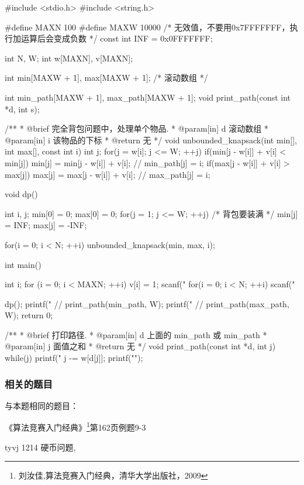 \begin{Codex}[label=coin_change3.c]
#include <stdio.h>
#include <string.h>

#define MAXN 100
#define MAXW 10000
 /* 无效值，不要用0x7FFFFFFF，执行加运算后会变成负数 */
const int INF = 0x0FFFFFFF;

int N, W;
int w[MAXN], v[MAXN];

int min[MAXW + 1], max[MAXW + 1]; /* 滚动数组 */

int min_path[MAXW + 1], max_path[MAXW + 1];
void print_path(const int *d, int s);

/**
 * @brief 完全背包问题中，处理单个物品.
 * @param[in] d 滚动数组
 * @param[in] i 该物品的下标
 * @return 无
 */
void unbounded_knapsack(int min[], int max[], const int i) {
    int j;
    for(j = w[i]; j <= W; ++j) {
        if(min[j - w[i]] + v[i] < min[j]) {
            min[j] = min[j - w[i]] + v[i];
            // min_path[j] = i;
        }
        if(max[j - w[i]] + v[i] > max[j]) {
            max[j] = max[j - w[i]] + v[i];
            // max_path[j] = i;
        }
    }
}

void dp() {
    int i, j;
    min[0] = 0;
    max[0] = 0;
    for(j = 1; j <= W; ++j) { /* 背包要装满 */
        min[j] = INF;
        max[j] = -INF;
    }

    for(i = 0; i < N; ++i) unbounded_knapsack(min, max, i);
}

int main() {
    int i;
    for (i = 0; i < MAXN; ++i) v[i] = 1;
    scanf("%
    for(i = 0; i < N; ++i) scanf("%

    dp();
    printf("%
    // print_path(min_path, W);
    printf("%
    // print_path(max_path, W);
    return 0;
}

/**
 * @brief 打印路径.
 * @param[in] d 上面的 min_path 或 min_path
 * @param[in] j 面值之和
 * @return 无
 */
void print_path(const int *d, int j) {
    while(j) {
        printf("%
        j -= w[d[j]];
    }
    printf("\n");
}
\end{Codex}

\subsubsection{相关的题目}
与本题相同的题目：
\begindot
\item 《算法竞赛入门经典》\footnote{刘汝佳,算法竞赛入门经典，清华大学出版社，2009}第162页例题9-3
\item  tyvj 1214 硬币问题, 
\myenddot


